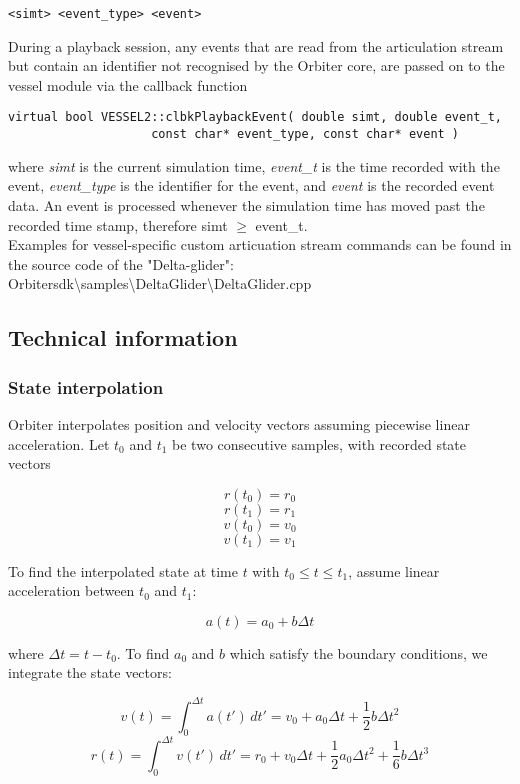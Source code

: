 \documentclass[Orbiter Technical Reference.tex]{subfiles}
\begin{document}
\begin{lstlisting}[language=OSFS]
<simt> <event_type> <event>
\end{lstlisting}

\noindent
During a playback session, any events that are read from the articulation stream but contain an identifier not recognised by the Orbiter core, are passed on to the vessel module via the callback function

\begin{lstlisting}
virtual bool VESSEL2::clbkPlaybackEvent( double simt, double event_t,
					const char* event_type, const char* event )
\end{lstlisting}

\noindent
where \textit{simt} is the current simulation time, \textit{event\_t} is the time recorded with the event, \textit{event\_type} is the identifier for the event, and \textit{event} is the recorded event data. An event is processed whenever the simulation time has moved past the recorded time stamp, therefore simt $\geq$ event\_t.\\
Examples for vessel-specific custom articuation stream commands can be found in the source code of the "Delta-glider": Orbitersdk\textbackslash samples\textbackslash DeltaGlider\textbackslash DeltaGlider.cpp

\subsection{Technical information}
\subsubsection{State interpolation}
Orbiter interpolates position and velocity vectors assuming piecewise linear acceleration. Let $t_{0}$ and $t_{1}$ be two consecutive samples, with recorded state vectors

\[ r(t_{0}) = r_{0} \]
\[ r(t_{1}) = r_{1} \]
\[ v(t_{0}) = v_{0} \]
\[ v(t_{1}) = v_{1} \]

\noindent
To find the interpolated state at time $t$ with $t_{0} \leq t \leq t_{1}$, assume linear acceleration between $t_{0}$ and $t_{1}$:

\[ a(t) = a_{0} + b\Delta t \]

\noindent
where $\Delta t = t - t_{0}$. To find $a_{0}$ and $b$ which satisfy the boundary conditions, we integrate the state vectors:

\[ v(t) = \int_{0}^{\Delta t} a(t') \,dt' = v_{0} + a_{0} \Delta t + \frac{1}{2}b \Delta t^{2} \]
\[ r(t) = \int_{0}^{\Delta t} v(t') \,dt' = r_{0} + v_{0} \Delta t + \frac{1}{2} a_{0} \Delta t^{2} + \frac{1}{6} b \Delta t^{3} \]
\end{document}
